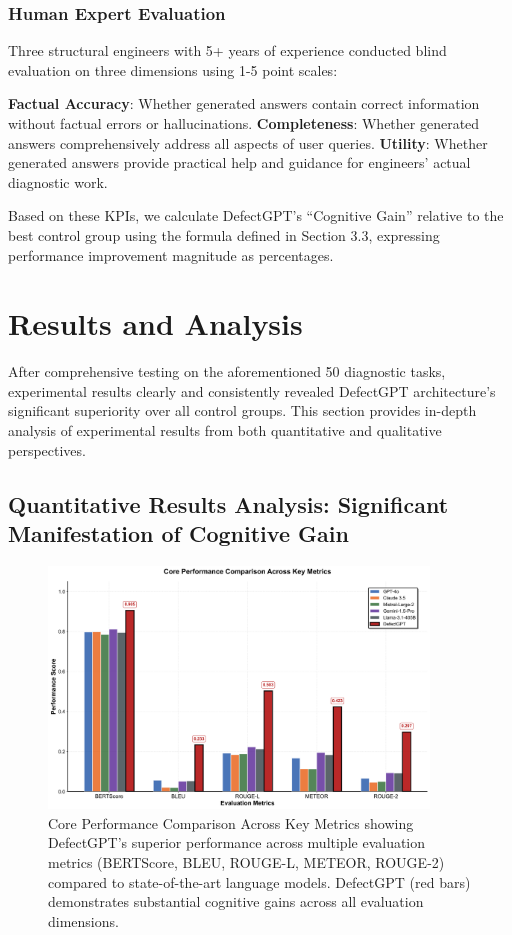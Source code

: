 \subsubsection{Human Expert Evaluation}

Three structural engineers with 5+ years of experience conducted blind evaluation on three dimensions using 1-5 point scales:

\textbf{Factual Accuracy}: Whether generated answers contain correct information without factual errors or hallucinations.
\textbf{Completeness}: Whether generated answers comprehensively address all aspects of user queries.
\textbf{Utility}: Whether generated answers provide practical help and guidance for engineers' actual diagnostic work.

Based on these KPIs, we calculate DefectGPT's ``Cognitive Gain'' relative to the best control group using the formula defined in Section 3.3, expressing performance improvement magnitude as percentages.

\section{Results and Analysis}

After comprehensive testing on the aforementioned 50 diagnostic tasks, experimental results clearly and consistently revealed DefectGPT architecture's significant superiority over all control groups. This section provides in-depth analysis of experimental results from both quantitative and qualitative perspectives.

\subsection{Quantitative Results Analysis: Significant Manifestation of Cognitive Gain}

\begin{figure}[htbp]
\centering
\includegraphics[width=0.9\textwidth]{figures/DefectGPT/performance comparison.png}
\caption{Core Performance Comparison Across Key Metrics showing DefectGPT's superior performance across multiple evaluation metrics (BERTScore, BLEU, ROUGE-L, METEOR, ROUGE-2) compared to state-of-the-art language models. DefectGPT (red bars) demonstrates substantial cognitive gains across all evaluation dimensions.}
\label{fig:performance-comparison}
\end{figure}

